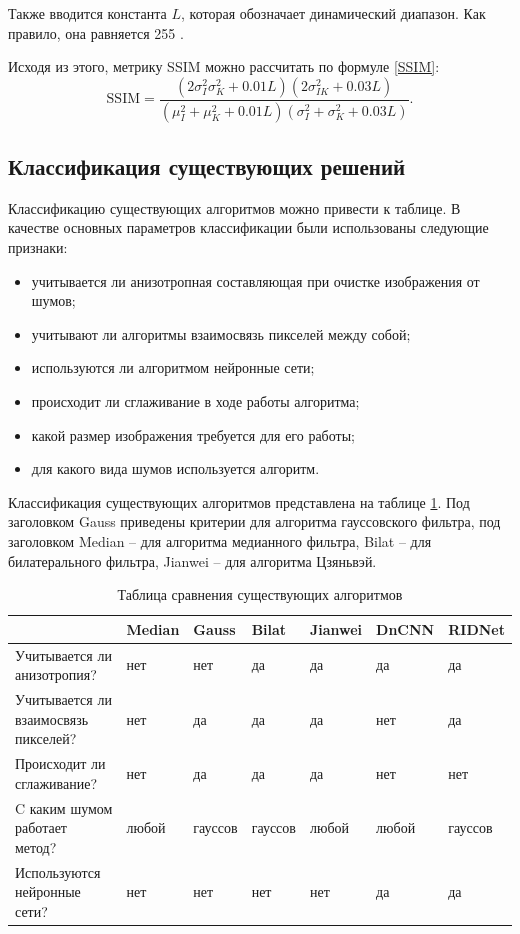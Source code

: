 Также вводится константа $L$, которая обозначает динамический диапазон. 
Как правило, она равняется 255 \cite{ssim}. 

Исходя из этого, метрику SSIM можно рассчитать по формуле \ref{SSIM}:
\begin{equation}
	\label{SSIM}
	\mathrm{SSIM} = \frac{(2\sigma^2_{I}\sigma^2_{K} + 0.01L)(2\sigma^2_{IK} + 0.03L)} { (\mu^2_{I}+\mu^2_{K} +0.01L)  (\sigma^2_{I} +\sigma^2_{K} +0.03L) }.
\end{equation}

\newpage
\subsection{Классификация существующих решений}
Классификацию существующих алгоритмов можно привести к таблице.
В качестве основных параметров классификации были использованы следующие признаки:
\begin{itemize}
	\item учитывается ли анизотропная составляющая при очистке изображения от шумов;
	\item учитывают ли алгоритмы взаимосвязь пикселей между собой;
	\item используются ли алгоритмом нейронные сети;
	\item происходит ли сглаживание в ходе работы алгоритма;
	\item какой размер изображения требуется для его работы;
	\item для какого вида шумов используется алгоритм.
\end{itemize}

Классификация существующих алгоритмов представлена на таблице \ref{table::class}.
Под заголовком Gauss приведены критерии для алгоритма гауссовского фильтра, под заголовком Median -- для алгоритма медианного фильтра, Bilat -- для билатерального фильтра, Jianwei -- для алгоритма Цзяньвэй.
\FloatBarrier
\begin{table}[h]
	\caption{Таблица сравнения существующих алгоритмов}
	\captionsetup{justification=raggedright,singlelinecheck=false}
	\centering
	\begin{tabular}{ | p{4cm} | p{1.6cm} | p{1.7cm} | p{1.7cm} | p{1.5cm} | p{1.7cm}| p{1.7cm} |}
		\hline
		& Median  & Gauss & Bilat & Jianwei & DnCNN &  RIDNet \\ 
		\hline
		Учитывается ли
		анизотропия?     & нет          & нет	  	 &  да        &	да & да & да \\
		\hline
		Учитывается ли взаимосвязь пикселей?   & нет  & да  	 &  да	   &	да		& нет & да \\
		\hline
		Происходит ли сглаживание? & нет 	& да & да & да & нет &  нет	   \\
		\hline
		C каким шумом работает метод?  & любой & гауссов &  гауссов  & любой & любой & гауссов \\
		\hline
		Используются нейронные сети?  & нет 	& нет 		 &  нет	   &	нет		& да & да \\
		\hline
	\end{tabular}
	\label{table::class}
\end{table}
\newpage

